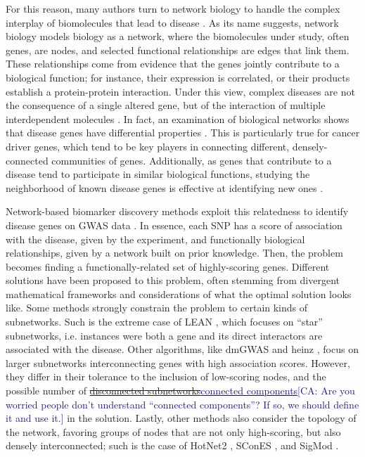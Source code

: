 \documentclass[twocolumn, 11pt]{article}
\newcommand{\cazcom}[2]{{\uline{#1}}\unskip\space\textcolor{MidnightBlue}{[CA: #2]}}
\newcommand{\caz}[2]{{\sout{#1}}\unskip\space\textcolor{MidnightBlue}{#2}}
\begin{document}
For this reason, many authors turn to network biology to handle the complex interplay of biomolecules that lead to disease \cite{furlong_human_2013}. As its name suggests, network biology models biology as a network, where the biomolecules under study, often genes, are nodes, and selected functional relationships are edges that link them. These relationships come from evidence that the genes jointly contribute to a biological function; for instance, their expression is correlated, or their products establish a protein-protein interaction. Under this view, complex diseases are not the consequence of a single altered gene, but of the interaction of multiple interdependent molecules \cite{barabasi_network_2011}. In fact, an examination of biological networks shows that disease genes have differential properties \cite{barabasi_network_2011,pinero_uncovering_2016}. This is particularly true for cancer driver genes, which tend to be key players in connecting different, densely-connected communities of genes. Additionally, as genes that contribute to a disease tend to participate in similar biological functions, studying the neighborhood of known disease genes is effective at identifying new ones \cite{huang_systematic_2018}. 

Network-based biomarker discovery methods exploit this relatedness to identify disease genes on GWAS data \cite{azencott_network-guided_2016}. In essence, each SNP has a score of association with the disease, given by the experiment, and functionally biological relationships, given by a network built on prior knowledge. Then, the problem becomes finding a functionally-related set of highly-scoring genes. Different solutions have been proposed to this problem, often stemming from divergent mathematical frameworks and considerations of what the optimal solution looks like. Some methods strongly constrain the problem to certain kinds of subnetworks. Such is the extreme case of LEAN \cite{gwinner_network-based_2016}, which focuses on ``star'' subnetworks, i.e. instances were both a gene and its direct interactors are associated with the disease. Other algorithms, like dmGWAS \cite{jia_dmgwas:_2011} and heinz \cite{dittrich_identifying_2008}, focus on larger subnetworks interconnecting genes with high association scores. However, they differ in their tolerance to the inclusion of low-scoring nodes, and the possible number of \cazcom{\caz{disconnected subnetworks}{connected components}}{Are you worried people don't understand ``connected components''? If so, we should define it and use it.} in the solution. Lastly, other methods also consider the topology of the network, favoring groups of nodes that are not only high-scoring, but also densely interconnected; such is the case of HotNet2 \cite{leiserson_pan-cancer_2015}, SConES \cite{azencott_efficient_2013}, and SigMod \cite{liu_sigmod:_2017}.
\end{document}

